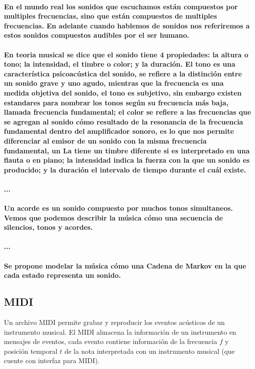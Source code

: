     
    \paragraph{En el mundo real los sonidos que escuchamos están compuestos por multiples frecuencias, sino que están compuestos de multiples frecuencias. En adelante cuando hablemos de sonidos nos referiremos a estos sonidos compuestos audibles por el ser humano.}
    
    \paragraph{En teoria musical se dice que el sonido tiene 4 propiedades: la altura o tono; la intensidad, el timbre o color; y la duración. El tono es una característica psicoacústica del sonido, se refiere a la distinción entre un sonido grave y uno agudo, mientras que la frecuencia es una medida objetiva del sonido, el tono es subjetivo, sin embargo existen estandares para nombrar los tonos según su frecuencia más baja, llamada frecuencia fundamental; el color se refiere a las frecuencias que se agregan al sonido cómo resultado de la resonancia de la frecuencia fundamental dentro del amplificador sonoro, es lo que nos permite diferenciar al emisor de un sonido con la misma frecuencia fundamental, un \textbf{La} tiene un timbre diferente si es interpretado en una flauta o en piano; la intensidad indica la fuerza con la que un sonido es producido; y la duración el intervalo de tiempo durante el cuál existe.}


    \paragraph{...}
    
    \paragraph{Un acorde es un sonido compuesto por muchos tonos simultaneos. Vemos que podemos describir la música cómo una secuencia de silencios, tonos y acordes.}

    \paragraph{...}
    
    \paragraph{Se propone modelar la música cómo una Cadena de Markov en la que cada estado representa un sonido.}

\subsection{MIDI}
Un archivo MIDI permite grabar y reproducir los eventos acústicos de un instrumento musical. El MIDI almacena la información de un instrumento en mensajes de eventos, cada evento contiene información de la frecuencia $f$ y posición temporal $t$ de la nota interpretada con un instrumento musical (que cuente con interfaz para MIDI).